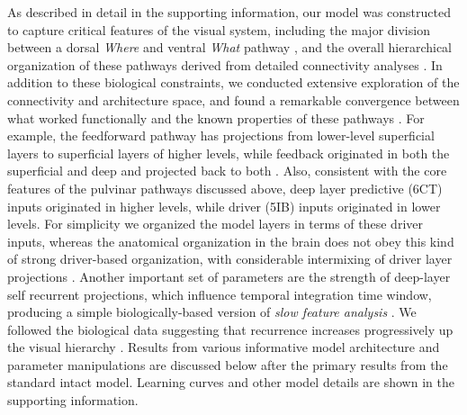 \documentclass[11pt,twoside]{article}
\newif\myifpdf
\begin{document}
As described in detail in the supporting information, our model was constructed to capture critical features of the visual system, including the major division between a dorsal \emph{Where} and ventral \emph{What} pathway \cite{UngerleiderMishkin82}, and the overall hierarchical organization of these pathways derived from detailed connectivity analyses \cite{RocklandPandya79,FellemanVanEssen91,MarkovVezoliChameauEtAl14,MarkovErcsey-RavaszGomesEtAl14}.  In addition to these biological constraints, we conducted extensive exploration of the connectivity and architecture space, and found a remarkable convergence between what worked functionally and the known properties of these pathways \cite{OReillyWyatteRohrlich17}.  For example, the feedforward pathway has projections from lower-level superficial layers to superficial layers of higher levels, while feedback originated in both the superficial and deep and projected back to both \cite{RocklandPandya79,FellemanVanEssen91}.  Also, consistent with the core features of the pulvinar pathways discussed above, deep layer predictive (6CT) inputs originated in higher levels, while driver (5IB) inputs originated in lower levels.  For simplicity we organized the model layers in terms of these driver inputs, whereas the anatomical organization in the brain does not obey this kind of strong driver-based organization, with considerable intermixing of driver layer projections \cite{Shipp03}.  Another important set of parameters are the strength of deep-layer self recurrent projections, which influence temporal integration time window, producing a simple biologically-based version of \emph{slow feature analysis} \cite{WiskottSejnowski02,Foldiak91}.  We followed the biological data suggesting that recurrence increases progressively up the visual hierarchy \cite{ChaudhuriKnoblauchGarielEtAl15}.  Results from various informative model architecture and parameter manipulations are discussed below after the primary results from the standard intact model.  Learning curves and other model details are shown in the supporting information.
\end{document}
